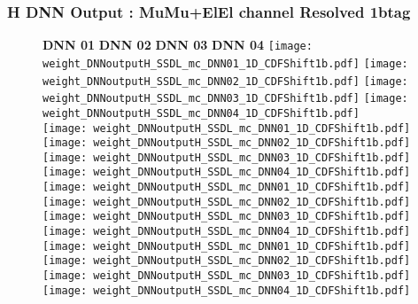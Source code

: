 \documentclass[9pt]{beamer}
\begin{document}
\begin{frame}
	\frametitle{H DNN Output : MuMu+ElEl channel Resolved 1btag}
	\begin{figure}
	    \textbf{DNN 01} \hspace{1.2cm} \textbf{DNN 02} \hspace{1.2cm} \textbf{DNN 03} \hspace{1.2cm} \textbf{DNN 04}
        \centering
		\texttt{[image: weight\_DNNoutputH\_SSDL\_mc\_DNN01\_1D\_CDFShift1b.pdf]}
		\texttt{[image: weight\_DNNoutputH\_SSDL\_mc\_DNN02\_1D\_CDFShift1b.pdf]}
		\texttt{[image: weight\_DNNoutputH\_SSDL\_mc\_DNN03\_1D\_CDFShift1b.pdf]}
		\texttt{[image: weight\_DNNoutputH\_SSDL\_mc\_DNN04\_1D\_CDFShift1b.pdf]}\\
		\texttt{[image: weight\_DNNoutputH\_SSDL\_mc\_DNN01\_1D\_CDFShift1b.pdf]}
		\texttt{[image: weight\_DNNoutputH\_SSDL\_mc\_DNN02\_1D\_CDFShift1b.pdf]}
		\texttt{[image: weight\_DNNoutputH\_SSDL\_mc\_DNN03\_1D\_CDFShift1b.pdf]}
		\texttt{[image: weight\_DNNoutputH\_SSDL\_mc\_DNN04\_1D\_CDFShift1b.pdf]}\\
		\texttt{[image: weight\_DNNoutputH\_SSDL\_mc\_DNN01\_1D\_CDFShift1b.pdf]}
		\texttt{[image: weight\_DNNoutputH\_SSDL\_mc\_DNN02\_1D\_CDFShift1b.pdf]}
		\texttt{[image: weight\_DNNoutputH\_SSDL\_mc\_DNN03\_1D\_CDFShift1b.pdf]}
		\texttt{[image: weight\_DNNoutputH\_SSDL\_mc\_DNN04\_1D\_CDFShift1b.pdf]}\\
		\texttt{[image: weight\_DNNoutputH\_SSDL\_mc\_DNN01\_1D\_CDFShift1b.pdf]}
		\texttt{[image: weight\_DNNoutputH\_SSDL\_mc\_DNN02\_1D\_CDFShift1b.pdf]}
		\texttt{[image: weight\_DNNoutputH\_SSDL\_mc\_DNN03\_1D\_CDFShift1b.pdf]}
		\texttt{[image: weight\_DNNoutputH\_SSDL\_mc\_DNN04\_1D\_CDFShift1b.pdf]}\\
	\end{figure}
\end{frame}
\end{document}
